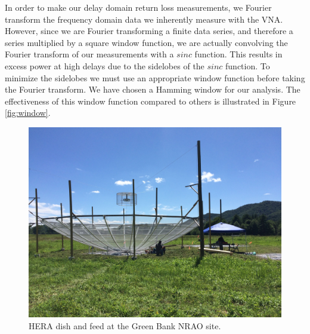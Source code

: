 \documentclass[12pt,preprint]{aastex}
\begin{document}

In order to make our delay domain return loss measurements, we Fourier transform
the frequency domain data we inherently measure with the VNA. However, since  we
are Fourier transforming a finite data series, and therefore a series multiplied
by a square window function, we are actually convolving the Fourier transform of
our measurements with a $sinc$ function. This results in excess power at high
delays due to the sidelobes of the $sinc$ function. To minimize the sidelobes we
 must use an appropriate window function before taking the Fourier transform.
We have chosen a Hamming window for our analysis. The effectiveness of this
window function compared to others is illustrated in Figure
\ref{fig:window}. 

\begin{figure}
\centering
\includegraphics[trim={2cm 20cm 30cm 15cm},clip, totalheight=0.3\textheight]{plots/heradish.jpg}
\caption{HERA dish and feed at the Green Bank NRAO site.}
\label{fig:heradish}
\end{figure}
\end{document}
